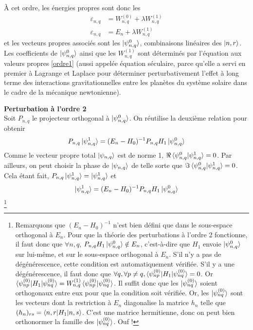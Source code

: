 \documentclass[11pt]{article}
\begin{document}
À cet ordre, les énergies propres sont donc les 
\begin{align*}
	\varepsilon_{n,q} &= W^{(0)}_{n,q} + \lambda W^{(1)}_{n,q} \\
	\varepsilon_{n,q} &= E_n + \lambda W^{(1)}_{n,q}
\end{align*}
et les vecteurs propres associés sont les $\ket{\psi^0_{n,q}}$, combinaisons linéaires des $\ket{n,r}$. Les coefficients de $\ket{\psi^0_{n,q}}$ ainsi que les $W^{(1)}_{n,q}$ sont déterminés par l'équation aux valeurs propres \eqref{ordre1} (aussi appelée équation séculaire, parce qu'elle a servi en premier à Lagrange et Laplace pour déterminer perturbativement l'effet à long terme des interactions gravitationnelles entre les planètes du système solaire dans le cadre de la mécanique newtonienne).

\textbf{Perturbation à l'ordre 2}\\
Soit $P_{n,q}$ le projecteur orthogonal à $\ket{\psi^0_{n,q}}$. On réutilise la deuxième relation pour obtenir
\begin{equation}
	P_{n,q} \ket{\psi^1_{n,q}} = (E_n - H_0)^{-1} P_{n,q} H_1 \ket{\psi^0_{n,q}}
\end{equation}
Comme le vecteur propre total $\ket{\psi_{n,q}}$ est de norme 1, $\Re \braket{\psi^0_{n,q} | \psi^1_{n,q}} = 0$. Par ailleurs, on peut choisir la phase de $\ket{\psi_{n,q}}$ de telle sorte que $\Im \braket{\psi^0_{n,q} | \psi^1_{n,q}} = 0$. 
Cela étant fait, $P_{n,q} \ket{\psi^1_{n,q}} = \ket{\psi^1_{n,q}}$ et
\begin{equation}
\label{ordre2}
	\ket{\psi^1_{n,q}} = (E_n - H_0)^{-1} P_{n,q} H_1 \ket{\psi^0_{n,q}}
\end{equation}\footnote{Remarquons que $(E_n - H_0)^{-1}$ n'est bien défini que dans le sous-espace orthogonal à $E_n$. Pour que la théorie des perturbations à l'ordre 2 fonctionne, il faut donc que $\forall n, q$, $P_{n,q} H_1 \ket{\psi^0_{n,q}} \notin E_n$, c'est-à-dire que $H_1$ envoie $\ket{\psi^0_{n,q}}$ sur lui-même, et sur le sous-espace orthogonal à $E_n$. S'il n'y a pas de dégénérescence, cette condition est automatiquement vérifiée. S'il y a une dégénérescence, il faut donc que $\forall q, \forall p \neq q, \braket{\psi_{np}^{(0)} | H_1 | \psi_{nq}^{(0)}}=0$. Or $\braket{\psi_{np}^{(0)} | H_1 | \psi_{nq}^{(0)}}=W^{(1)}_{n,q} \braket{\psi_{np}^{(0)} | \psi_{nq}^{(0)}}$. Il suffit donc que les $\ket{\psi_{nq}^{(0)}}$ soient orthogonaux entre eux pour que la condition soit vérifiée. Or, les $\ket{\psi_{nq}^{(0)}}$ sont les vecteurs dont la restriction à $E_n$ diagonalise la matrice $h_n$ telle que $(h_{n})_{rs} = \braket{n,r|H_1|n,s}$.  C'est une matrice hermitienne, donc on peut bien orthonormer la famille des $\ket{\psi_{nq}^{(0)}}$. Ouf !}
\end{document}
